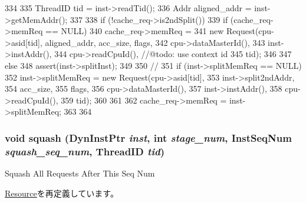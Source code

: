 \begin{DoxyCode}
334 {
335     ThreadID tid = inst->readTid();
336     Addr aligned_addr = inst->getMemAddr();
337 
338     if (!cache_req->is2ndSplit()) {
339         if (cache_req->memReq == NULL) {
340             cache_req->memReq =
341                 new Request(cpu->asid[tid], aligned_addr, acc_size, flags,
342                             cpu->dataMasterId(),
343                             inst->instAddr(),
344                             cpu->readCpuId(), //@todo: use context id
345                             tid);
346         }
347     } else {
348         assert(inst->splitInst);
349 
350         //
351         if (inst->splitMemReq == NULL) {
352             inst->splitMemReq = new Request(cpu->asid[tid], 
353                                             inst->split2ndAddr,
354                                             acc_size, 
355                                             flags, 
356                                             cpu->dataMasterId(),
357                                             inst->instAddr(),
358                                             cpu->readCpuId(), 
359                                             tid);
360         }
361 
362         cache_req->memReq = inst->splitMemReq;
363     }
364 }
\end{DoxyCode}
\hypertarget{classCacheUnit_a52235c5e3d912452f254dc45f1496fd2}{
\subsubsection[{squash}]{\setlength{\rightskip}{0pt plus 5cm}void squash ({\bf DynInstPtr} {\em inst}, \/  int {\em stage\_\-num}, \/  {\bf InstSeqNum} {\em squash\_\-seq\_\-num}, \/  {\bf ThreadID} {\em tid})}}
\label{classCacheUnit_a52235c5e3d912452f254dc45f1496fd2}
Squash All Requests After This Seq Num 

\hyperlink{classResource_a52235c5e3d912452f254dc45f1496fd2}{Resource}を再定義しています。


